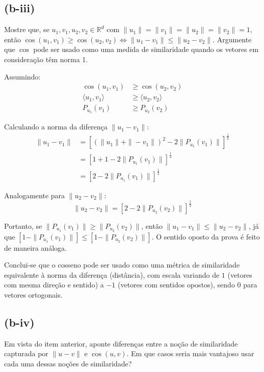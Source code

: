 \subsection*{(b-iii)}
Mostre que, se $u_1, v_1, u_2, v_2 \in \mathbb{R}^d$ com $\|u_1\| = \|v_1\| = \|u_2\| = \|v_2\| = 1$, então $\cos(u_1, v_1) \geq \cos(u_2, v_2) \iff \|u_1 - v_1\| \leq \|u_2 - v_2\|$. Argumente que $\cos$ pode ser usado como uma medida de similaridade quando os vetores em consideração têm norma 1.

\vspace{0.5em}
\noindent Assumindo:
\begin{align*}
    \cos(u_1, v_1)           & \geq \cos(u_2, v_2)           \\
    \langle u_1, v_1 \rangle & \geq \langle u_2, v_2 \rangle \\
    P_{u_1}(v_1)             & \geq P_{u_2}(v_2)
\end{align*}

\noindent Calculando a norma da diferença $\|u_1 - v_1\|$:
\begin{align*}
    \|u_1 - v_1\| & = \left[ (\|u_1\| + \|-v_1\|)^2 - 2\|P_{u_1}(v_1)\| \right]^{\frac{1}{2}} \\
                  & = [1 + 1 - 2\|P_{u_1}(v_1)\|]^{\frac{1}{2}}                               \\
                  & = [2 - 2\|P_{u_1}(v_1)\|]^{\frac{1}{2}}
\end{align*}

\noindent Analogamente para $\|u_2 - v_2\|$:
\begin{equation*}
    \|u_2 - v_2\| = [2 - 2\|P_{u_2}(v_2)\|]^{\frac{1}{2}}
\end{equation*}

\noindent Portanto, se $\|P_{u_1}(v_1)\| \geq \|P_{u_2}(v_2)\|$, então $\|u_1 - v_1\| \leq \|u_2 - v_2\|$, já que $[1 - \|P_{u_1}(v_1)\|] \leq [1 - \|P_{u_2}(v_2)\|]$. O sentido oposto da prova é feito de maneira análoga.

\noindent Conclui-se que o cosseno pode ser usado como uma métrica de similaridade equivalente à norma da diferença (distância), com escala variando de $1$ (vetores com mesma direção e sentido) a $-1$ (vetores com sentidos opostos), sendo $0$ para vetores ortogonais.

\subsection*{(b-iv)}
Em vista do item anterior, aponte diferenças entre a noção de similaridade capturada por $\|u - v\|$ e $\cos(u, v)$. Em que casos seria mais vantajoso usar cada uma dessas noções de similaridade?

